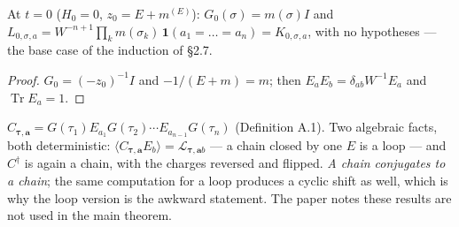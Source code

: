 \begin{lemma}\label{eq:2.67}
  \leanok{}
  At $t=0$ ($H_0=0$, $z_0=E+m^{(E)}$): $G_0(\sigma)=m(\sigma)I$ and
  $L_{0,\sigma,a}=W^{-n+1}\prod_k m(\sigma_k)\,\mathbf 1(a_1=\dots=a_n)=K_{0,\sigma,a}$, with no
  hypotheses --- the base case of the induction of \S2.7.
\end{lemma}
\begin{proof}\leanok
  $G_0=(-z_0)^{-1}I$ and $-1/(E+m)=m$; then $E_aE_b=\delta_{ab}W^{-1}E_a$ and $\operatorname{Tr}E_a=1$.
\end{proof}

\begin{definition}\label{def:gchain}
  \leanok{}
  $C_{\boldsymbol\tau,\mathbf a} = G(\tau_1)E_{a_1}G(\tau_2)\cdots E_{a_{n-1}}G(\tau_n)$
  (Definition A.1).  Two algebraic facts, both deterministic:
  $\langle C_{\boldsymbol\tau,\mathbf a}E_b\rangle = \mathcal L_{\boldsymbol\tau,\mathbf a b}$
  --- a chain closed by one $E$ is a loop --- and $C^\dagger$ is again a chain, with the
  charges reversed and flipped.  \emph{A chain conjugates to a chain}; the same computation
  for a loop produces a cyclic shift as well, which is why the loop version is the awkward
  statement.  The paper notes these results are not used in the main theorem.
\end{definition}


